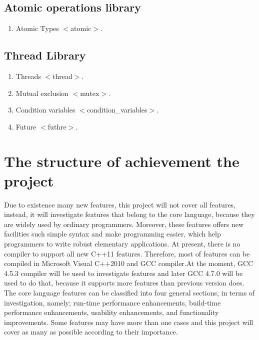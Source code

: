 \documentclass[12pt,a4paper]{report}
\begin{document}
\subsection{Atomic operations library}
\label{sub-section:	Atomic operations library}
\begin{enumerate}
\item Atomic Types $<$atomic$>$.
\end{enumerate}

\subsection{Thread Library }
\label{sub-section: Thread library }
\begin{enumerate}
\item Threads $<$thread$>$.
\item Mutual exclusion $<$mutex$>$.
\item Condition variables $<$condition\_variables$>$.
\item Future $<$futhre$>$.
\end{enumerate}


\section{The structure of achievement  the project}
\label{section:The structure of achievement  the project}
Due to existence many new features, this project will not cover all features, instead, it will investigate features that belong to the core language, because they are widely used by ordinary programmers.  Moreover, these features offers new facilities such simple syntax and make programming easier, which help programmers to write robust elementary applications.
\newline
At present, there is no compiler to support all new C++11 features. Therefore, most of features can be compiled in Microsoft Visual C++2010 and GCC compiler.At the moment,  GCC 4.5.3  compiler will be used to investigate features and later GCC 4.7.0 will be used to do that, because it supports more features than previous version does.
\newline
The core language features can be classified into four general sections, in terms of investigation, namely; run-time performance enhancements, build-time performance enhancements, usability enhancements, and functionality improvements. Some features may have more than one cases and this project will cover as many as possible according to their importance.
\newline
\end{document}
